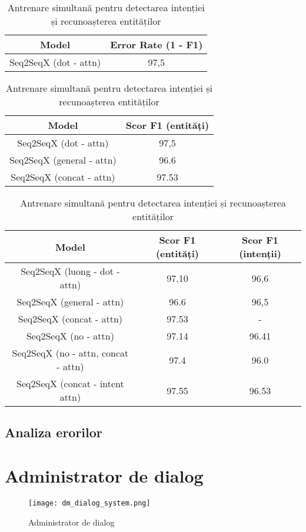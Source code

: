 \begin{table}[htp]
	\caption{Antrenare independentă pentru detectarea intenției}
	\label{rezultate1}
	\centering
	\begin{tabular}{ c c }
		
		\hline
		\textbf{Model} 		 & \textbf{Error Rate (1 - F1)}\\
		\hline
		Seq2SeqX (dot - attn) & 97,5 \\
		\hline
	\end{tabular}
	\bigskip
	
	\caption{Antrenare independentă pentru recunoașterea entităților}
	\label{rezultate2}
	\centering
	\begin{tabular}{ c c } 
		\hline
		\textbf{Model}	& \textbf{Scor F1 (entități)} \\
		\hline
		Seq2SeqX (dot - attn) & 97,5 \\
		\hline
		Seq2SeqX (general - attn) & 96.6 \\
		\hline
		Seq2SeqX (concat - attn) & 97.53 \\
		\hline
	\end{tabular}
	\bigskip
	
	\caption{Antrenare simultană pentru detectarea intenției și recunoașterea entităților}
	\label{rezultate3}
	\centering
	\begin{tabular}{ c c c } 
		\hline
		\textbf{Model} 		 & \textbf{Scor F1 (entități)} & \textbf{Scor F1 (intenții)}\\
		\hline
		Seq2SeqX (luong - dot - attn) & 97,10 & 96,6 \\ %
		\hline
		Seq2SeqX (general - attn) & 96.6 & 96,5 \\
		\hline
		Seq2SeqX (concat - attn) & 97.53 & - \\
		\hline
		Seq2SeqX (no - attn) & 97.14 & 96.41 \\ %
		\hline
		Seq2SeqX (no - attn, concat - attn) & 97.4 & 96.0 \\
		\hline
		Seq2SeqX (concat - intent attn) & 97.55 & 96.53 \\
		\hline
	\end{tabular}
\end{table}

\subsection{Analiza erorilor}


\section{Administrator de dialog}
\begin{figure}[h]
	\centering
	\texttt{[image: dm\_dialog\_system.png]}
	\caption{Administrator de dialog}
	\label{fig:dm_ds_proc}
\end{figure}

